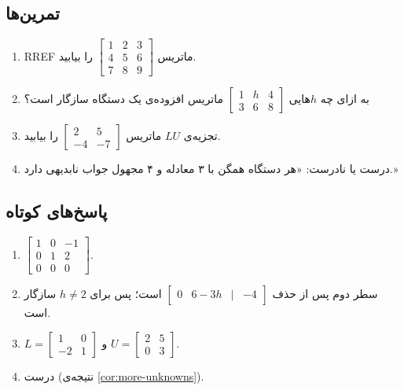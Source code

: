 \subsection*{تمرین‌ها}
\begin{enumerate}
  \item RREF ماتریس $\begin{bmatrix}1&2&3\\4&5&6\\7&8&9\end{bmatrix}$ را بیابید.
  \item به ازای چه $h$هایی $\left[\begin{array}{cc|c}1&h&4\\3&6&8\end{array}\right]$ ماتریس افزوده‌ی یک دستگاه سازگار است؟
  \item تجزیه‌ی $LU$ ماتریس $\begin{bmatrix}2&5\\-4&-7\end{bmatrix}$ را بیابید.
  \item درست یا نادرست: «هر دستگاه همگن با ۳ معادله و ۴ مجهول جواب نابدیهی دارد.»
\end{enumerate}

\subsection*{پاسخ‌های کوتاه}
\begin{enumerate}
  \item $\begin{bmatrix}1&0&-1\\0&1&2\\0&0&0\end{bmatrix}$.
  \item سطر دوم پس از حذف $\begin{bmatrix}0&6-3h&|&-4\end{bmatrix}$ است؛ پس برای $h\neq2$ سازگار است.
  \item $L=\begin{bmatrix}1&0\\-2&1\end{bmatrix}$ و $U=\begin{bmatrix}2&5\\0&3\end{bmatrix}$.
  \item درست (نتیجه‌ی \ref{cor:more-unknowns}).
\end{enumerate}
